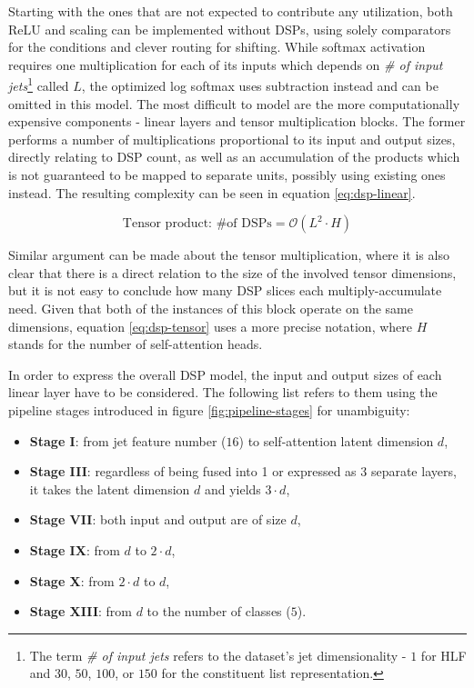 Starting with the ones that are not expected to contribute any utilization, both ReLU and scaling can be implemented without DSPs, using solely comparators for the conditions and clever routing for shifting. While softmax activation requires one multiplication for each of its inputs which depends on \textit{\# of input jets}\footnote{The term \textit{\# of input jets} refers to the dataset's jet dimensionality - \(1\) for HLF and \(30\), \(50\), \(100\), or \(150\) for the constituent list representation.} called \(L\), the optimized log softmax uses subtraction instead and can be omitted in this model. The most difficult to model are the more computationally expensive components - linear layers and tensor multiplication blocks. The former performs a number of multiplications proportional to its input and output sizes, directly relating to DSP count, as well as an accumulation of the products which is not guaranteed to be mapped to separate units, possibly using existing ones instead. The resulting complexity can be seen in equation \ref{eq:dsp-linear}.

\begin{equation} \label{eq:dsp-tensor}
  \text{Tensor product: \# of DSPs} = \mathcal{O}( L^2 \cdot H )
\end{equation}

Similar argument can be made about the tensor multiplication, where it is also clear that there is a direct relation to the size of the involved tensor dimensions, but it is not easy to conclude how many DSP slices each multiply-accumulate need. Given that both of the instances of this block operate on the same dimensions, equation \ref{eq:dsp-tensor} uses a more precise notation, where \(H\) stands for the number of self-attention heads.

In order to express the overall DSP model, the input and output sizes of each linear layer have to be considered. The following list refers to them using the pipeline stages introduced in figure \ref{fig:pipeline-stages} for unambiguity:

\begin{itemize}
  \item \textbf{Stage I}: from jet feature number (\(16\)) to self-attention latent dimension \(d\),
  \item \textbf{Stage III}: regardless of being fused into 1 or expressed as 3 separate layers, it takes the latent dimension \(d\) and yields \(3 \cdot d\),
  \item \textbf{Stage VII}: both input and output are of size \(d\),
  \item \textbf{Stage IX}: from \(d\) to \(2 \cdot d\),
  \item \textbf{Stage X}: from \(2 \cdot d\) to \(d\),
  \item \textbf{Stage XIII}: from \(d\) to the number of classes (\(5\)).
\end{itemize}

